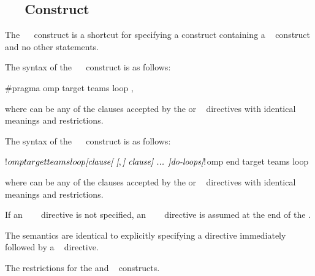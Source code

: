 \subsection{~~ Construct}
\label{subsec:target teams loop}
\summary
The ~~ construct is a shortcut for specifying a 
construct containing a ~ construct and no other statements.

\syntax
\begin{ccppspecific}
The syntax of the ~~ construct is as follows:

\begin{ompcPragma}[fontsize=\small]
#pragma omp target teams loop \plc{[clause[ [},\plc{] clause] ... ] new-line}
\end{ompcPragma}

where  can be any of the clauses accepted by the  or
~ directives with identical
meanings and restrictions.
\end{ccppspecific}

\begin{fortranspecific}
The syntax of the ~~ construct is as follows:

\begin{ompfPragma}
!$omp target teams loop \plc{[clause[ [},\plc{] clause] ... ]}
    \plc{do-loops}
\plc{[}!$omp end target teams loop\plc{]}
\end{ompfPragma}

where  can be any of the clauses accepted by the  or
~ directives with identical meanings and restrictions.

If an ~~~ directive is not specified, an
~~~
directive is assumed at the end of the .
\end{fortranspecific}

\descr
The semantics are identical to explicitly specifying a 
directive immediately followed by a ~ directive.


\restrictions
The restrictions for the  and ~ constructs.


